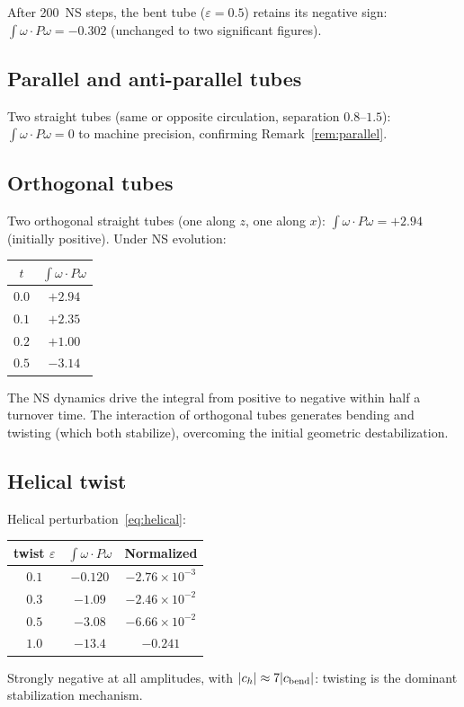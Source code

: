\documentclass[11pt,a4paper]{article}
\theoremstyle{plain}
\theoremstyle{definition}
\theoremstyle{remark}
\begin{document}
After 200~NS steps, the bent tube ($\varepsilon=0.5$)
retains its negative sign:
$\int\omega\cdot P\omega = -0.302$
(unchanged to two significant figures).

\subsection{Parallel and anti-parallel tubes}

Two straight tubes (same or opposite circulation,
separation $0.8$--$1.5$):
$\int\omega\cdot P\omega = 0$ to machine precision,
confirming Remark~\ref{rem:parallel}.

\subsection{Orthogonal tubes}

Two orthogonal straight tubes (one along $z$, one
along $x$):
$\int\omega\cdot P\omega = +2.94$ (initially
positive).  Under NS evolution:
\begin{center}
\renewcommand{\arraystretch}{1.2}
\begin{tabular}{@{}cc@{}}
\toprule
$t$ & $\int\omega\cdot P\omega$ \\
\midrule
$0.0$ & $+2.94$ \\
$0.1$ & $+2.35$ \\
$0.2$ & $+1.00$ \\
$0.5$ & $\mathbf{-3.14}$ \\
\bottomrule
\end{tabular}
\end{center}
The NS dynamics drive the integral from positive to
negative within half a turnover time.  The interaction
of orthogonal tubes generates bending and twisting
(which both stabilize), overcoming the initial
geometric destabilization.

\subsection{Helical twist}

Helical perturbation~\eqref{eq:helical}:
\begin{center}
\renewcommand{\arraystretch}{1.2}
\begin{tabular}{@{}ccc@{}}
\toprule
twist $\varepsilon$ & $\int\omega\cdot P\omega$
  & Normalized \\
\midrule
$0.1$ & $-0.120$ & $-2.76\!\times\!10^{-3}$ \\
$0.3$ & $-1.09$ & $-2.46\!\times\!10^{-2}$ \\
$0.5$ & $-3.08$ & $-6.66\!\times\!10^{-2}$ \\
$1.0$ & $-13.4$ & $-0.241$ \\
\bottomrule
\end{tabular}
\end{center}
Strongly negative at all amplitudes, with
$|c_h|\approx 7|c_{\rm bend}|$: twisting is the
dominant stabilization mechanism.
\end{document}
